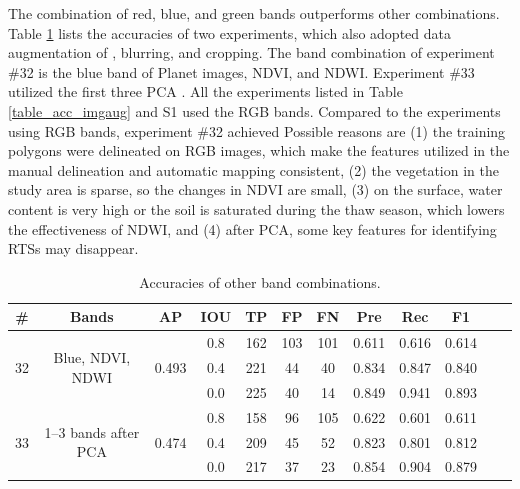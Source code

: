 \documentclass[authoryear,preprint,review,12pt]{elsarticle}
\begin{document}
The combination of red, blue, and green bands outperforms other combinations.
Table \ref{table_acc_otherbands} lists the accuracies of two experiments, which also adopted data augmentation of , blurring, and cropping. The band combination of experiment \#32 is the blue band of Planet images, NDVI, and NDWI. Experiment \#33 utilized the first three PCA . All the experiments listed in Table \ref{table_acc_imgaug} and S1 used the RGB bands. Compared to the experiments using RGB bands, experiment \#32  achieved   Possible reasons are (1) the training polygons were delineated on RGB images, which make the features utilized in the manual delineation and automatic mapping consistent, (2) the vegetation in the study area is sparse, so the changes in NDVI are small, (3) on the surface, water content is very high or the soil is saturated during the thaw season, which lowers the effectiveness of NDWI, and (4) after PCA, some key features for identifying RTSs may disappear. 

\begin{table}[ht]
\footnotesize
\caption{Accuracies of other band combinations.}
\label{table_acc_otherbands}
\begin{tabular}{c c c c  c ccc c c c c}
\toprule
\textbf{\#}&\textbf{Bands}&\textbf{AP}&\textbf{IOU}&\textbf{TP}&\textbf{FP}&\textbf{FN}&\textbf{Pre}&\textbf{Rec}&\textbf{F1}\\
\midrule

\multirow{3}{*}{32} &  \multirow{3}{3cm}{Blue, NDVI, NDWI} & \multirow{3}{*}{0.493}  &0.8&162   & 103   & 101   & 0.611  & 0.616  & 0.614   \\
 &  &  &0.4&221   & 44    & 40    & 0.834  & 0.847  & 0.840 \\
 &  &  &0.0&225   & 40    & 14    & 0.849  & 0.941  & 0.893   \\
 
\midrule

\multirow{3}{*}{33} &  \multirow{3}{3cm}{1--3 bands after PCA} & \multirow{3}{*}{0.474} &0.8& 158   & 96    & 105   & 0.622  & 0.601  & 0.611  \\
 &  &  &0.4& 209   & 45    & 52    & 0.823  & 0.801  & 0.812  \\
 &  & &0.0& 217   & 37    & 23    & 0.854  & 0.904  & 0.879  \\

\bottomrule
\end{tabular}

\end{table}
\end{document}
